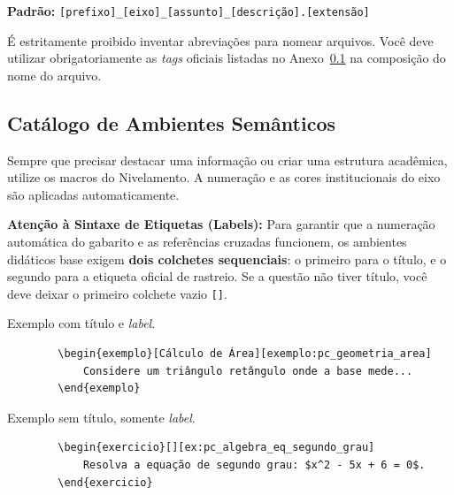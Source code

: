 \begin{center}
    \textbf{Padrão:} \verb|[prefixo]_[eixo]_[assunto]_[descrição].[extensão]|
\end{center}





É estritamente proibido inventar abreviações para nomear arquivos. Você deve utilizar obrigatoriamente as \textit{tags} oficiais listadas no Anexo~\ref{} na composição do nome do arquivo.

\subsection{Catálogo de Ambientes Semânticos}

Sempre que precisar destacar uma informação ou criar uma estrutura acadêmica, utilize os macros do Nivelamento. A numeração e as cores institucionais do eixo são aplicadas automaticamente.

\textbf{Atenção à Sintaxe de Etiquetas (Labels):} Para garantir que a numeração automática do gabarito e as referências cruzadas funcionem, os ambientes didáticos base exigem \textbf{dois colchetes sequenciais}: o primeiro para o título, e o segundo para a etiqueta oficial de rastreio. Se a questão não tiver título, você deve deixar o primeiro colchete vazio \verb|[]|.

\begin{exemplo}
    Exemplo com título e \textit{label}.
    \begin{verbatim}
        \begin{exemplo}[Cálculo de Área][exemplo:pc_geometria_area]
            Considere um triângulo retângulo onde a base mede...
        \end{exemplo}
    \end{verbatim} 

    Exemplo sem título, somente \textit{label}.
    \begin{verbatim}
        \begin{exercicio}[][ex:pc_algebra_eq_segundo_grau]
            Resolva a equação de segundo grau: $x^2 - 5x + 6 = 0$.
        \end{exercicio}
    \end{verbatim}
\end{exemplo}

